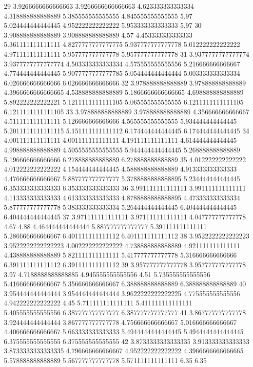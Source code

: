 29 3.9266666666666663 3.9266666666666663 4.623333333333334 4.318888888888889 5.385555555555555 4.845555555555555 5.97 5.024444444444445 4.952222222222222 5.953333333333333 5.97
30 3.908888888888889 3.908888888888889 4.57 4.453333333333333 5.361111111111111 4.8277777777777775 5.937777777777778 5.012222222222222 4.971111111111111 5.957777777777778 5.957777777777778
31 3.9377777777777774 3.9377777777777774 4.503333333333334 4.575555555555556 5.216666666666667 4.774444444444445 5.9077777777777785 5.054444444444444 5.003333333333334 6.026666666666666 6.026666666666666
32 3.978888888888889 3.978888888888889 4.3966666666666665 4.538888888888889 5.1866666666666665 4.698888888888889 5.892222222222221 5.1211111111111105 5.065555555555555 6.1211111111111105 6.1211111111111105
33 3.978888888888889 3.978888888888889 4.356666666666667 4.511111111111111 5.126666666666666 4.565555555555555 5.934444444444445 5.2011111111111115 5.151111111111112 6.174444444444445 6.174444444444445
34 4.001111111111111 4.001111111111111 4.191111111111111 4.614444444444445 4.998888888888889 4.5055555555555555 5.944444444444445 5.268888888888889 5.196666666666666 6.278888888888889 6.278888888888889
35 4.012222222222222 4.012222222222222 4.154444444444445 4.588888888888889 4.913333333333333 4.476666666666667 5.887777777777777 5.3788888888888895 5.234444444444445 6.353333333333333 6.353333333333333
36 3.991111111111111 3.991111111111111 4.113333333333333 4.613333333333333 4.8788888888888895 4.473333333333334 5.877777777777778 5.383333333333334 5.264444444444445 6.404444444444445 6.404444444444445
37 3.971111111111111 3.971111111111111 4.047777777777778 4.67 4.88 4.464444444444444 5.887777777777777 5.391111111111111 5.286666666666667 6.401111111111112 6.401111111111112
38 3.9522222222222223 3.9522222222222223 4.002222222222222 4.738888888888889 4.921111111111111 4.438888888888889 5.821111111111111 5.417777777777778 5.316666666666666 6.391111111111112 6.391111111111112
39 3.957777777777778 3.957777777777778 3.97 4.7188888888888885 4.945555555555556 4.51 5.735555555555556 5.416666666666667 5.356666666666667 6.388888888888889 6.388888888888889
40 3.954444444444444 3.954444444444444 3.9622222222222225 4.775555555555556 4.942222222222222 4.45 5.711111111111111 5.411111111111111 5.405555555555556 6.387777777777777 6.387777777777777
41 3.867777777777778 3.924444444444444 3.867777777777778 4.756666666666667 5.016666666666667 4.406666666666667 5.663333333333333 5.4944444444444445 5.4944444444444445 6.375555555555555 6.375555555555555
42 3.8733333333333335 3.913333333333333 3.8733333333333335 4.796666666666667 4.952222222222222 4.3966666666666665 5.578888888888889 5.567777777777778 5.571111111111111 6.35 6.35
